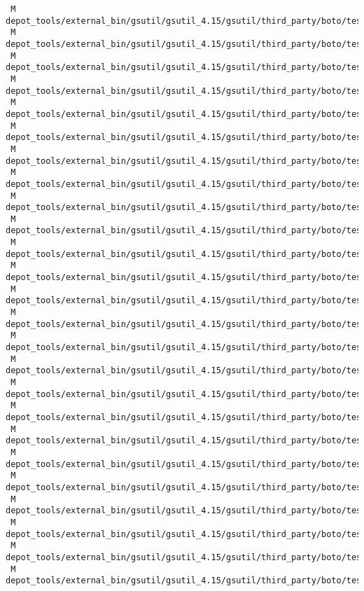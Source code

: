 \documentclass{article}
\begin{document}
\begin{verbatim}
 M depot_tools/external_bin/gsutil/gsutil_4.15/gsutil/third_party/boto/tests/unit/cloudsearch/test_document.py
 M depot_tools/external_bin/gsutil/gsutil_4.15/gsutil/third_party/boto/tests/unit/cloudsearch/test_exceptions.py
 M depot_tools/external_bin/gsutil/gsutil_4.15/gsutil/third_party/boto/tests/unit/cloudsearch/test_search.py
 M depot_tools/external_bin/gsutil/gsutil_4.15/gsutil/third_party/boto/tests/unit/cloudsearch2/test_document.py
 M depot_tools/external_bin/gsutil/gsutil_4.15/gsutil/third_party/boto/tests/unit/cloudsearch2/test_exceptions.py
 M depot_tools/external_bin/gsutil/gsutil_4.15/gsutil/third_party/boto/tests/unit/cloudsearch2/test_search.py
 M depot_tools/external_bin/gsutil/gsutil_4.15/gsutil/third_party/boto/tests/unit/dynamodb/test_batch.py
 M depot_tools/external_bin/gsutil/gsutil_4.15/gsutil/third_party/boto/tests/unit/dynamodb/test_types.py
 M depot_tools/external_bin/gsutil/gsutil_4.15/gsutil/third_party/boto/tests/unit/dynamodb2/test_table.py
 M depot_tools/external_bin/gsutil/gsutil_4.15/gsutil/third_party/boto/tests/unit/ec2/test_connection.py
 M depot_tools/external_bin/gsutil/gsutil_4.15/gsutil/third_party/boto/tests/unit/ec2/test_networkinterface.py
 M depot_tools/external_bin/gsutil/gsutil_4.15/gsutil/third_party/boto/tests/unit/ec2/test_reservedinstance.py
 M depot_tools/external_bin/gsutil/gsutil_4.15/gsutil/third_party/boto/tests/unit/ec2/test_volume.py
 M depot_tools/external_bin/gsutil/gsutil_4.15/gsutil/third_party/boto/tests/unit/emr/test_emr_responses.py
 M depot_tools/external_bin/gsutil/gsutil_4.15/gsutil/third_party/boto/tests/unit/emr/test_instance_group_args.py
 M depot_tools/external_bin/gsutil/gsutil_4.15/gsutil/third_party/boto/tests/unit/glacier/test_layer1.py
 M depot_tools/external_bin/gsutil/gsutil_4.15/gsutil/third_party/boto/tests/unit/glacier/test_layer2.py
 M depot_tools/external_bin/gsutil/gsutil_4.15/gsutil/third_party/boto/tests/unit/glacier/test_response.py
 M depot_tools/external_bin/gsutil/gsutil_4.15/gsutil/third_party/boto/tests/unit/glacier/test_writer.py
 M depot_tools/external_bin/gsutil/gsutil_4.15/gsutil/third_party/boto/tests/unit/iam/test_connection.py
 M depot_tools/external_bin/gsutil/gsutil_4.15/gsutil/third_party/boto/tests/unit/kms/test_kms.py
 M depot_tools/external_bin/gsutil/gsutil_4.15/gsutil/third_party/boto/tests/unit/mturk/test_connection.py
 M depot_tools/external_bin/gsutil/gsutil_4.15/gsutil/third_party/boto/tests/unit/mws/test_connection.py
 M depot_tools/external_bin/gsutil/gsutil_4.15/gsutil/third_party/boto/tests/unit/mws/test_response.py
 M depot_tools/external_bin/gsutil/gsutil_4.15/gsutil/third_party/boto/tests/unit/provider/test_provider.py

\end{verbatim}
\end{document}
